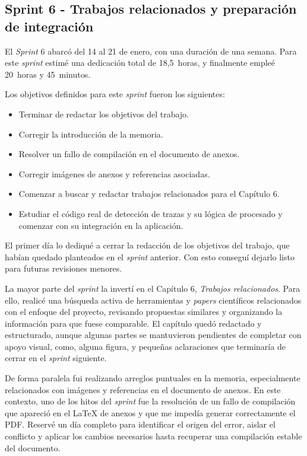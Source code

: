 \subsection{Sprint 6 - Trabajos relacionados y preparación de integración}
El \textit{Sprint} 6 abarcó del 14 al 21 de enero, con una duración de una semana. Para este \textit{sprint} estimé una dedicación total de 18,5~horas, y finalmente empleé 20~horas y 45~minutos.

Los objetivos definidos para este \textit{sprint} fueron los siguientes:
\begin{itemize}
	\item Terminar de redactar los objetivos del trabajo.
	\item Corregir la introducción de la memoria.
	\item Resolver un fallo de compilación en el documento de anexos.
	\item Corregir imágenes de anexos y referencias asociadas.
	\item Comenzar a buscar y redactar trabajos relacionados para el Capítulo 6.
	\item Estudiar el código real de detección de trazas y su lógica de procesado y comenzar con su integración en la aplicación.
\end{itemize}

El primer día lo dediqué a cerrar la redacción de los objetivos del trabajo, que habían quedado planteados en el \textit{sprint} anterior. Con esto conseguí dejarlo listo para futuras revisiones menores.

La mayor parte del \textit{sprint} la invertí en el Capítulo 6, \textit{Trabajos relacionados}. Para ello, realicé una búsqueda activa de herramientas y \textit{papers} científicos relacionados con el enfoque del proyecto, revisando propuestas similares y organizando la información para que fuese comparable. El capítulo quedó redactado y estructurado, aunque algunas partes se mantuvieron pendientes de completar con apoyo visual, como, alguna figura, y pequeñas aclaraciones que terminaría de cerrar en el \textit{sprint} siguiente.

De forma paralela fui realizando arreglos puntuales en la memoria, especialmente relacionados con imágenes y referencias en el documento de anexos. En este contexto, uno de los hitos del \textit{sprint} fue la resolución de un fallo de compilación que apareció en el \LaTeX{} de anexos y que me impedía generar correctamente el PDF. Reservé un día completo para identificar el origen del error, aislar el conflicto y aplicar los cambios necesarios hasta recuperar una compilación estable del documento.

